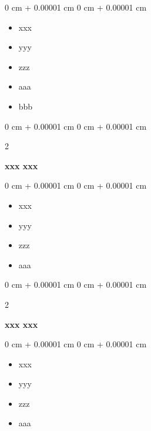 \documentclass[10pt, letterpaper]{article}
\newenvironment{highlights}{
    \begin{itemize}[
        topsep=0.10 cm,
        parsep=0.10 cm,
        partopsep=0pt,
        itemsep=0pt,
        leftmargin=0 cm + 10pt
    ]
}{
    \end{itemize}
} %
\newenvironment{onecolentry}{
    \begin{adjustwidth}{
        0 cm + 0.00001 cm
    }{
        0 cm + 0.00001 cm
    }
}{
    \end{adjustwidth}
} %
\newenvironment{twocolentry}[2][]{
    \onecolentry
    \def\secondColumn{#2}
    \setcolumnwidth{\fill, 4.5 cm}
    \begin{paracol}{2}
}{
    \switchcolumn \raggedleft \secondColumn
    \end{paracol}
    \endonecolentry
} %
\begin{document}
        \vspace{0.10 cm}
        \begin{onecolentry}
            \begin{highlights}
                \item xxx 
                \item yyy
                \item zzz
                \item aaa
                \item bbb
            \end{highlights}
        \end{onecolentry}

        \vspace{0.2 cm}

        \begin{twocolentry}{
            
        }
            \textbf{xxx xxx}\end{twocolentry}

        \vspace{0.10 cm}
        \begin{onecolentry}
            \begin{highlights}
                \item xxx
                \item yyy
                \item zzz
                \item aaa
                
            \end{highlights}
        \end{onecolentry}

        \vspace{0.2 cm}

        \begin{twocolentry}{
            
        }
            \textbf{xxx xxx}\end{twocolentry}

        \vspace{0.10 cm}
        \begin{onecolentry}
            \begin{highlights}
                \item xxx
                \item yyy
                \item zzz
                \item aaa
            \end{highlights}
        \end{onecolentry}
\end{document}
